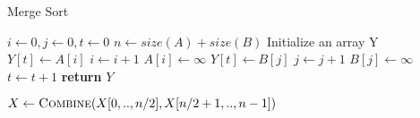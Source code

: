 \documentclass{article}
\begin{document}
\begin{algorithm}
\caption{Merge Sort}
\begin{algorithmic}[1]
 
    \State $i \gets 0 , j \gets 0 , t \gets 0$
    \State $n \gets size(A)+size(B)$
    \State Initialize an array Y
                    \State $Y[t] \gets A[i]$
                    \State $i \gets i+1$
                              \State $A[i] \gets \infty $
                    \EndIf
            \Else
                    \State $Y[t] \gets B[j]$
                    \State $j \gets j+1$
                            \State $B[j] \gets \infty $
                    \EndIf                
            \EndIf
            \State $t \gets t+1$
    \EndWhile   
    \State \textbf{return } $Y$
\EndProcedure
\Statex
\end{algorithmic}

\begin{algorithmic}[1]
        \State {} 
        \State {} 
        \State $X \gets \Call {Combine}{X[0,..,n/2], X[n/2+1,..,n-1]} $
    \EndIf
\EndProcedure
\end{algorithmic}

\end{algorithm}
\end{document}
